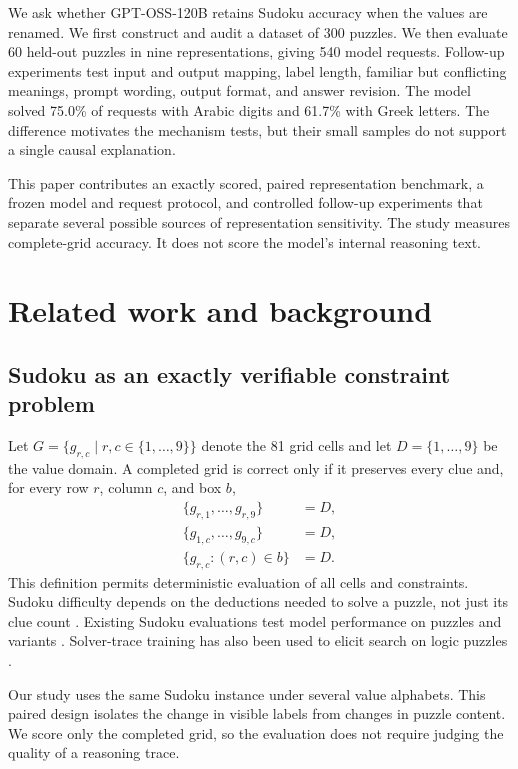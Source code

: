 \documentclass[11pt,a4paper]{article}
\begin{document}
We ask whether GPT-OSS-120B retains Sudoku accuracy when the values are renamed. We first construct and audit a dataset of 300 puzzles. We then evaluate 60 held-out puzzles in nine representations, giving 540 model requests. Follow-up experiments test input and output mapping, label length, familiar but conflicting meanings, prompt wording, output format, and answer revision. The model solved 75.0\% of requests with Arabic digits and 61.7\% with Greek letters. The difference motivates the mechanism tests, but their small samples do not support a single causal explanation.

This paper contributes an exactly scored, paired representation benchmark, a frozen model and request protocol, and controlled follow-up experiments that separate several possible sources of representation sensitivity. The study measures complete-grid accuracy. It does not score the model's internal reasoning text.

\section{Related work and background}
\subsection{Sudoku as an exactly verifiable constraint problem}
Let $G=\{g_{r,c}\mid r,c\in\{1,\ldots,9\}\}$ denote the 81 grid cells and let $D=\{1,\ldots,9\}$ be the value domain. A completed grid is correct only if it preserves every clue and, for every row $r$, column $c$, and box $b$,
\begin{align}
\{g_{r,1},\ldots,g_{r,9}\}&=D,\\
\{g_{1,c},\ldots,g_{9,c}\}&=D,\\
\{g_{r,c}:(r,c)\in b\}&=D.
\end{align}
This definition permits deterministic evaluation of all cells and constraints. Sudoku difficulty depends on the deductions needed to solve a puzzle, not just its clue count \citep{pelanek2014sudoku}. Existing Sudoku evaluations test model performance on puzzles and variants \citep{seely2025sudokubench}. Solver-trace training has also been used to elicit search on logic puzzles \citep{shah2024causal}.

Our study uses the same Sudoku instance under several value alphabets. This paired design isolates the change in visible labels from changes in puzzle content. We score only the completed grid, so the evaluation does not require judging the quality of a reasoning trace.
\end{document}
